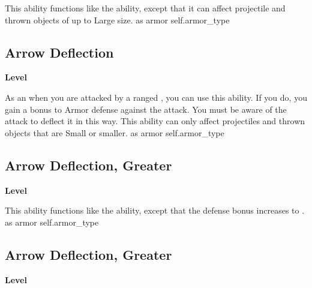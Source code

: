 \vspace{-1.5em}  %
This ability functions like the  ability, except that it can affect projectile and thrown objects of up to Large size.
 
 as armor
 {self.armor_type}
\begin{multicols}{2}
\lowercase{\hypertarget{item:Arrow Deflection}{}}\label{item:Arrow Deflection}
\hypertarget{item:Arrow Deflection}{\subsection{Arrow Deflection}}
\columnbreak%
\begin{flushright}
\large\textbf{ Level}
\end{flushright}
\end{multicols}
\vspace{-1.5em}  %
As an  when you are attacked by a ranged , you can use this ability.
If you do, you gain a  bonus to Armor defense against the attack.
You must be aware of the attack to deflect it in this way.
This ability can only affect projectiles and thrown objects that are Small or smaller.
 
 as armor
 {self.armor_type}
\begin{multicols}{2}
\lowercase{\hypertarget{item:Arrow Deflection, Greater}{}}\label{item:Arrow Deflection, Greater}
\hypertarget{item:Arrow Deflection, Greater}{\subsection{Arrow Deflection, Greater}}
\columnbreak%
\begin{flushright}
\large\textbf{ Level}
\end{flushright}
\end{multicols}
\vspace{-1.5em}  %
This ability functions like the  ability, except that the defense bonus increases to .
 
 as armor
 {self.armor_type}
\begin{multicols}{2}
\lowercase{\hypertarget{item:Arrow Deflection, Greater}{}}\label{item:Arrow Deflection, Greater}
\hypertarget{item:Arrow Deflection, Greater}{\subsection{Arrow Deflection, Greater}}
\columnbreak%
\begin{flushright}
\large\textbf{ Level}
\end{flushright}
\end{multicols}
